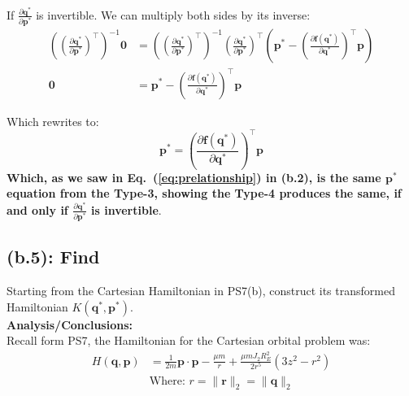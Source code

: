 \documentclass[titlepage]{article}
\begin{document}
If $\frac{\partial\boldsymbol{q}^*}{\partial\boldsymbol{p}^*}$ is invertible. We can multiply both sides by its inverse:
\begin{equation}
	\begin{split}
		\left(\left(\frac{\partial\boldsymbol{q}^*}{\partial\boldsymbol{p}^*}\right)^\top\right)^{-1}\boldsymbol{0}&=\left(\left(\frac{\partial\boldsymbol{q}^*}{\partial\boldsymbol{p}^*}\right)^\top\right)^{-1}\left(\frac{\partial\boldsymbol{q}^*}{\partial\boldsymbol{p}^*}\right)^\top\left(\boldsymbol{p}^*-\left(\frac{\partial\boldsymbol{f}(\boldsymbol{q}^*)}{\partial\boldsymbol{q}^*}\right)^\top\boldsymbol{p}\right) \\
		\boldsymbol{0}&=\boldsymbol{p}^*-\left(\frac{\partial\boldsymbol{f}(\boldsymbol{q}^*)}{\partial\boldsymbol{q}^*}\right)^\top\boldsymbol{p}
	\end{split}
\end{equation}

\begin{mdframed}[linewidth=1pt, innertopmargin=10pt, innerbottommargin=10pt]
	Which rewrites to:
	\begin{equation}
		\boldsymbol{p}^*=\left(\frac{\partial\boldsymbol{f}(\boldsymbol{q}^*)}{\partial\boldsymbol{q}^*}\right)^\top\boldsymbol{p}
	\end{equation}
	\textbf{Which, as we saw in Eq.~(\ref{eq:prelationship}) in (b.2), is the same $\boldsymbol{p}^*$ equation from the Type-3, showing the Type-4 produces the same, if and only if $\frac{\partial\boldsymbol{q}^*}{\partial\boldsymbol{p}^*}$ is invertible}.\\
\end{mdframed}

\newpage

\subsection*{(b.5): Find}

Starting from the Cartesian Hamiltonian in PS7(b), construct its transformed Hamiltonian $K(\boldsymbol{q}^*,\boldsymbol{p}^*)$. \\

\textbf{Analysis/Conclusions:} \\

Recall form PS7, the Hamiltonian for the Cartesian orbital problem was:
\begin{equation}
	\begin{split}
		H(\boldsymbol{q},\boldsymbol{p})&=\frac{1}{2m}\boldsymbol{p}\cdot\boldsymbol{p}-\frac{\mu m}{r}+\frac{\mu mJ_2R_E^2}{2r^5}\left(3z^2-r^2\right) \\
		&\text{Where: }r=\|\boldsymbol{r}\|_2=\|\boldsymbol{q}\|_2
	\end{split}
\end{equation}
\end{document}
